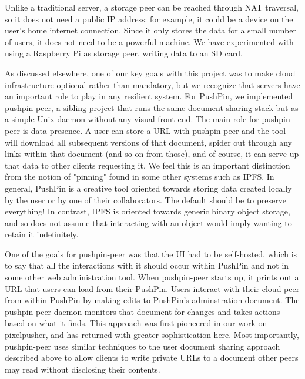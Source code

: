 \documentclass[sigplan,10pt]{acmart}
\begin{document}
Unlike a traditional server, a storage peer can be reached through NAT traversal, so it does not need a public IP address: for example, it could be a device on the user's home internet connection.
Since it only stores the data for a small number of users, it does not need to be a powerful machine.
We have experimented with using a Raspberry Pi as storage peer, writing data to an SD card.


As discussed elsewhere, one of our key goals with this project was to make cloud infrastructure optional rather than mandatory, but we recognize that servers have an important role to play in any resilient system. For PushPin, we implemented pushpin-peer, a sibling project that runs the same document sharing stack but as a simple Unix daemon without any visual front-end. The main role for pushpin-peer is data presence. A user can store a URL with pushpin-peer and the tool will download all subsequent versions of that document, spider out through any links within that document (and so on from those), and of course, it can serve up that data to other clients requesting it. We feel this is an important distinction from the notion of "pinning" found in some other systems such as IPFS. In general, PushPin is a creative tool oriented towards storing data created locally by the user or by one of their collaborators. The default should be to preserve everything! In contrast, IPFS is oriented towards generic binary object storage, and so does not assume that interacting with an object would imply wanting to retain it indefinitely.

One of the goals for pushpin-peer was that the UI had to be self-hosted, which is to say that all the interactions with it should occur within PushPin and not in some other web administration tool. When pushpin-peer starts up, it prints out a URL that users can load from their PushPin. Users interact with their cloud peer from within PushPin by making edits to PushPin's adminstration document. The pushpin-peer daemon monitors that document for changes and takes actions based on what it finds. This approach was first pioneered in our work on pixelpusher, and has returned with greater sophistication here. Most importantly, pushpin-peer uses similar techniques to the user document sharing approach described above to allow clients to write private URLs to a document other peers may read without disclosing their contents.
\end{document}

